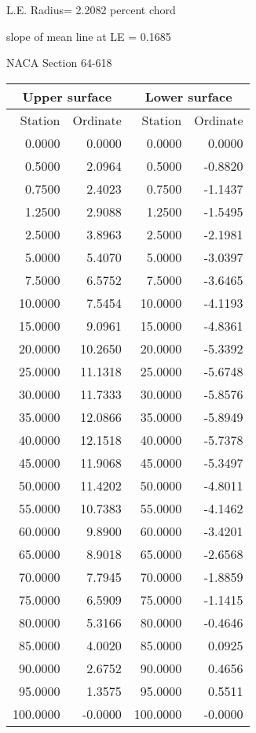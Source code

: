 \documentclass[11pt]{book}
\begin{document}
L.E. Radius=  2.2082 percent chord


 slope of mean line at LE =  0.1685
 \newpage
  \label{s64-618}
 \begin{Large}
 NACA Section 64-618
 \end{Large}
  
 \vspace{8mm}
 \begin{tabular}{|r|r|r|r|} \hline 
 \multicolumn{2}{|c|}{Upper surface} & \multicolumn{2}{|c|}{Lower surface} \\
 \hline
 Station & Ordinate & Station & Ordinate \\
 \hline
0.0000 & 0.0000 & 0.0000 & 0.0000 \\
0.5000 & 2.0964 & 0.5000 & -0.8820 \\
0.7500 & 2.4023 & 0.7500 & -1.1437 \\
1.2500 & 2.9088 & 1.2500 & -1.5495 \\
2.5000 & 3.8963 & 2.5000 & -2.1981 \\
5.0000 & 5.4070 & 5.0000 & -3.0397 \\
7.5000 & 6.5752 & 7.5000 & -3.6465 \\
10.0000 & 7.5454 & 10.0000 & -4.1193 \\
15.0000 & 9.0961 & 15.0000 & -4.8361 \\
20.0000 & 10.2650 & 20.0000 & -5.3392 \\
25.0000 & 11.1318 & 25.0000 & -5.6748 \\
30.0000 & 11.7333 & 30.0000 & -5.8576 \\
35.0000 & 12.0866 & 35.0000 & -5.8949 \\
40.0000 & 12.1518 & 40.0000 & -5.7378 \\
45.0000 & 11.9068 & 45.0000 & -5.3497 \\
50.0000 & 11.4202 & 50.0000 & -4.8011 \\
55.0000 & 10.7383 & 55.0000 & -4.1462 \\
60.0000 & 9.8900 & 60.0000 & -3.4201 \\
65.0000 & 8.9018 & 65.0000 & -2.6568 \\
70.0000 & 7.7945 & 70.0000 & -1.8859 \\
75.0000 & 6.5909 & 75.0000 & -1.1415 \\
80.0000 & 5.3166 & 80.0000 & -0.4646 \\
85.0000 & 4.0020 & 85.0000 & 0.0925 \\
90.0000 & 2.6752 & 90.0000 & 0.4656 \\
95.0000 & 1.3575 & 95.0000 & 0.5511 \\
100.0000 & -0.0000 & 100.0000 & -0.0000 \\
 \hline 
 \end{tabular}
\end{document}
